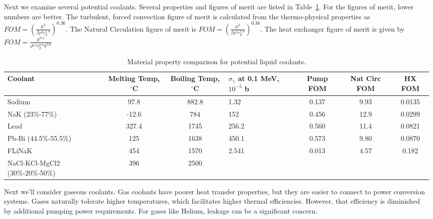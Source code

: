 \documentclass[]{report}
\begin{document}
Next we examine several potential coolants. Several properties and figures of merit are listed in Table~\ref{tab:coolant_properties}. For the figures of merit, lower numbers are better. The turbulent, forced convection figure of merit is calculated from the thermo-physical properties as $FOM=\left(\frac{\mu^2}{\beta\rho^2c_p^{1.8} } \right)^{0.36}$. The Natural Circulation figure of merit is $FOM= \left( \frac{\mu^2}{\beta\rho^2c_p^{1.8}}  \right)^{0.36}$. The heat exchanger figure of merit is given by $FOM= \frac{\mu^{0.2}}{\rho^{0.3}c_p^{0.6}k^{0.6}}$

\begin{table} \label{tab:coolant_properties}
\hspace*{-2cm} %
\begin{tabular}{|l|c|c|p{2.5cm}|c|c|c|}
%
%
\hline
Coolant & Melting Temp, $^{\circ}$C & Boiling Temp, $^{\circ}$C & $\sigma_\gamma $ at 0.1 MeV, $10^{-5}$ b & Pump FOM & Nat Circ FOM & HX FOM \\
\hline
Sodium & 97.8 & 882.8 & 1.32 & 0.137 & 9.93 & 0.0135 \\
\hline
NaK (23\%-77\%) & -12.6 & 784 & 152 & 0.456 & 12.9 & 0.0299\\
\hline
Lead & 327.4 & 1745 & 256.2 & 0.560 & 11.4 & 0.0821\\
\hline
Pb-Bi (44.5\%-55.5\%) & 125 & 1638 & 450.1 & 0.573 & 9.80 & 0.0870\\
\hline
FLiNaK & 454 & 1570 & 2.541 & 0.013 & 4.57 & 0.182\\
\hline
NaCl-KCl-MgCl2 (30\%-20\%-50\%) & 396 & 2500 &  &  &  & \\
\hline
\end{tabular}
\caption{Material property comparison for potential liquid coolants.\cite{IAEA_1}}
\end{table}

Next we'll consider gaseous coolants. Gas coolants have poorer heat transfer properties, but they are easier to connect to power conversion systems. Gases naturally tolerate higher temperatures, which facilitates higher thermal efficiencies. However, that efficiency is diminished by additional pumping power requirements.
For gases like Helium, leakage can be a significant concern. 
\end{document}
